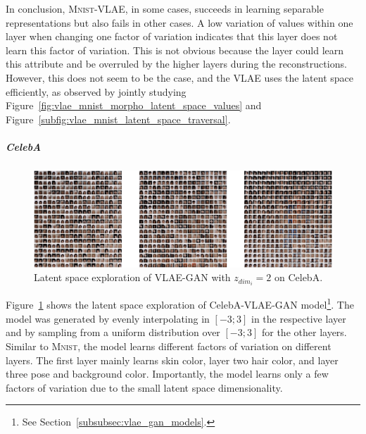 In conclusion, \textsc{Mnist}-\ac{VLAE}, in some cases, succeeds in learning separable representations but also fails in other cases.
A low variation of values within one layer when changing one factor of variation indicates that this layer does not learn this factor of variation.
This is not obvious because the layer could learn this attribute and be overruled by the higher layers during the reconstructions.
However, this does not seem to be the case, and the \ac{VLAE} uses the latent space efficiently, as observed by jointly studying Figure~\ref{fig:vlae_mnist_morpho_latent_space_values} and Figure~\ref{subfig:vlae_mnist_latent_space_traversal}.

\subparagraph{CelebA}

\begin{figure}
    \centering
    \includegraphics[width=\textwidth]{images/latent_space_traversals/vlae_gan_celeba.png}
    \caption[VLAE-GAN on CelebA: Latent Space Exploration]{Latent space exploration of VLAE-GAN with $z_{dim_i}=2$ on CelebA.}
    \label{fig:celeba_latent_space_traversal}
\end{figure}

Figure~\ref{fig:celeba_latent_space_traversal} shows the latent space exploration of CelebA-\ac{VLAE}-\ac{GAN} model\footnote{See Section~\ref{subsubsec:vlae_gan_models}.}.
The model was generated by evenly interpolating in $[-3; 3]$ in the respective layer and by sampling from a uniform distribution over $[-3; 3]$ for the other layers.
Similar to \textsc{Mnist}, the model learns different factors of variation on different layers.
The first layer mainly learns skin color, layer two hair color, and layer three pose and background color.
Importantly, the model learns only a few factors of variation due to the small latent space dimensionality.

